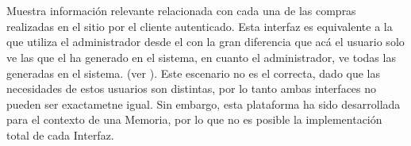 \section{\ordersEF}\label{chapter:solucionimplementada:section:orders}
Muestra información relevante relacionada con cada una de las compras realizadas en el sitio por el cliente autenticado. Esta interfaz es equivalente a la que utiliza el administrador desde el \dashboardEF con la gran diferencia que acá el usuario solo ve las \ordersEF que el ha generado en el sistema, en cuanto el administrador, ve todas las \ordersEF generadas en el sistema. (ver ). Este escenario no es el correcta, dado que las necesidades de estos usuarios son distintas, por lo tanto ambas interfaces no pueden ser exactametne igual. Sin embargo, esta plataforma ha sido desarrollada para el contexto de una Memoria, por lo que no es posible la implementación total de cada Interfaz.




